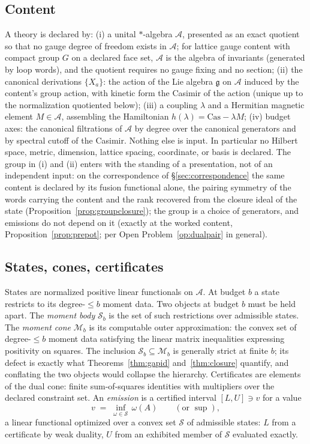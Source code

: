 \documentclass[11pt]{article}
\theoremstyle{definition}
\theoremstyle{remark}
\newcommand{\A}{\mathcal{A}}
\newcommand{\g}{\mathfrak{g}}
\begin{document}
\subsection{Content}\label{sec:content}
A theory is declared by: (i) a unital $*$-algebra $\A$, presented as an
exact quotient so that no gauge degree of freedom exists in $\A$; for
lattice gauge content with compact group $G$ on a declared face set, $\A$
is the algebra of invariants (generated by loop words), and the quotient
requires no gauge fixing and no section; (ii) the canonical derivations
$\{X_a\}$: the action of the Lie algebra $\g$ on $\A$ induced by the
content's group action, with kinetic form the Casimir of the action
(unique up to the normalization quotiented below); (iii) a coupling
$\lambda$ and a Hermitian magnetic element $M \in \A$, assembling the
Hamiltonian $h(\lambda) = \mathrm{Cas} - \lambda M$; (iv) budget axes:
the canonical filtrations of $\A$ by degree over the canonical generators
and by spectral cutoff of the Casimir.  Nothing else is input.  In
particular no Hilbert space, metric, dimension, lattice spacing,
coordinate, or basis is declared.  The group in (i) and (ii) enters
with the standing of a presentation, not of an independent input: on
the correspondence of \S\ref{sec:correspondence} the same content is
declared by its fusion functional alone, the pairing symmetry of the
words carrying the content and the rank recovered from the closure
ideal of the state (Proposition~\ref{prop:groupclosure}); the group is
a choice of generators, and emissions do not depend on it (exactly at
the worked content, Proposition~\ref{prop:prepot}; per Open
Problem~\ref{op:dualpair} in general).

\subsection{States, cones, certificates}\label{sec:cones}
States are normalized positive linear functionals on $\A$.  At budget $b$
a state restricts to its degree-$\le b$ moment data.  Two objects at
budget $b$ must be held apart.  The \emph{moment body} $\mathcal S_b$
is the set of such restrictions over admissible states.  The
\emph{moment cone} $\mathcal M_b$ is its computable outer
approximation: the convex
set of degree-$\le b$ moment data satisfying the linear matrix
inequalities expressing positivity on squares.  The inclusion
$\mathcal S_b \subseteq \mathcal M_b$ is generally strict at finite
$b$; its defect is exactly what Theorems~\ref{thm:gapid}
and~\ref{thm:closure} quantify, and conflating the two objects would
collapse the hierarchy.  Certificates are elements
of the dual cone: finite sum-of-squares identities with multipliers over
the declared constraint set.  An \emph{emission} is a certified interval
$[L,U] \ni v$ for a value
\[
v \;=\; \inf_{\omega \in \mathcal S} \,\omega(A)
\qquad (\text{or } \sup),
\]
a linear functional optimized over a convex set $\mathcal S$ of
admissible states: $L$ from a certificate by weak duality, $U$ from an
exhibited member of $\mathcal S$ evaluated exactly.
\end{document}

